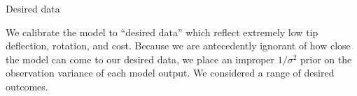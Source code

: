 \documentclass[final]{beamer}
\newlength{\onecolwid}
\newlength{\twocolwid}
\begin{document}
\begin{frame}[t]
\begin{columns}[t]
\begin{column}{\twocolwid}
\begin{columns}[t,totalwidth=\twocolwid]
\begin{column}{\onecolwid}

\begin{alertblock}{Desired data}

We calibrate the model to ``desired data'' which reflect extremely low tip deflection, rotation, and cost. Because we are antecedently ignorant of how close the model can come to our desired data, we place an improper $1/\sigma^2$ prior on the observation variance of each model output. We considered a range of desired outcomes.

\end{alertblock}

\end{column} %

\end{columns} %








\begin{columns}[t,totalwidth=\twocolwid] %

\begin{column}{\onecolwid} %


\end{column}
\end{columns}
\end{column}
\end{columns}
\end{frame}
\end{document}
